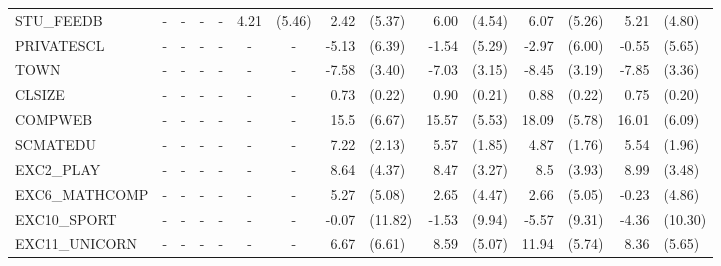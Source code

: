 \documentclass[10pt]{article}
\begin{document}
\begin{table}[htbp]
\begin{tabular}{lrlrlrlrlrlrlrl}
    STU\_FEEDB & \multicolumn{1}{c}{-} & \multicolumn{1}{c}{-} & \multicolumn{1}{c}{-} & \multicolumn{1}{c}{-} & 4.21  & (5.46) & 2.42  & (5.37) & 6.00  & (4.54) & 6.07  & (5.26) & 5.21  & (4.80) \\[0.2em]
    PRIVATESCL & \multicolumn{1}{c}{-} & \multicolumn{1}{c}{-} & \multicolumn{1}{c}{-} & \multicolumn{1}{c}{-} & \multicolumn{1}{c}{-} & \multicolumn{1}{c}{-} & -5.13 & (6.39) & -1.54 & (5.29) & -2.97 & (6.00) & -0.55 & (5.65) \\[0.2em]
    TOWN  & \multicolumn{1}{c}{-} & \multicolumn{1}{c}{-} & \multicolumn{1}{c}{-} & \multicolumn{1}{c}{-} & \multicolumn{1}{c}{-} & \multicolumn{1}{c}{-} & -7.58 & (3.40) & -7.03 & (3.15) & -8.45 & (3.19) & -7.85 & (3.36) \\[0.2em]
    CLSIZE & \multicolumn{1}{c}{-} & \multicolumn{1}{c}{-} & \multicolumn{1}{c}{-} & \multicolumn{1}{c}{-} & \multicolumn{1}{c}{-} & \multicolumn{1}{c}{-} & 0.73  & (0.22) & 0.90  & (0.21) & 0.88  & (0.22) & 0.75  & (0.20) \\[0.2em]
    COMPWEB & \multicolumn{1}{c}{-} & \multicolumn{1}{c}{-} & \multicolumn{1}{c}{-} & \multicolumn{1}{c}{-} & \multicolumn{1}{c}{-} & \multicolumn{1}{c}{-} & 15.5  & (6.67) & 15.57 & (5.53) & 18.09 & (5.78) & 16.01 & (6.09) \\[0.2em]
    SCMATEDU & \multicolumn{1}{c}{-} & \multicolumn{1}{c}{-} & \multicolumn{1}{c}{-} & \multicolumn{1}{c}{-} & \multicolumn{1}{c}{-} & \multicolumn{1}{c}{-} & 7.22  & (2.13) & 5.57  & (1.85) & 4.87  & (1.76) & 5.54  & (1.96) \\[0.2em]
    EXC2\_PLAY & \multicolumn{1}{c}{-} & \multicolumn{1}{c}{-} & \multicolumn{1}{c}{-} & \multicolumn{1}{c}{-} & \multicolumn{1}{c}{-} & \multicolumn{1}{c}{-} & 8.64  & (4.37) & 8.47  & (3.27) & 8.5   & (3.93) & 8.99  & (3.48) \\[0.2em]
    EXC6\_MATHCOMP & \multicolumn{1}{c}{-} & \multicolumn{1}{c}{-} & \multicolumn{1}{c}{-} & \multicolumn{1}{c}{-} & \multicolumn{1}{c}{-} & \multicolumn{1}{c}{-} & 5.27  & (5.08) & 2.65  & (4.47) & 2.66  & (5.05) & -0.23 & (4.86) \\[0.2em]
    EXC10\_SPORT & \multicolumn{1}{c}{-} & \multicolumn{1}{c}{-} & \multicolumn{1}{c}{-} & \multicolumn{1}{c}{-} & \multicolumn{1}{c}{-} & \multicolumn{1}{c}{-} & -0.07 & (11.82) & -1.53 & (9.94) & -5.57 & (9.31) & -4.36 & (10.30) \\[0.2em]
    EXC11\_UNICORN & \multicolumn{1}{c}{-} & \multicolumn{1}{c}{-} & \multicolumn{1}{c}{-} & \multicolumn{1}{c}{-} & \multicolumn{1}{c}{-} & \multicolumn{1}{c}{-} & 6.67  & (6.61) & 8.59  & (5.07) & 11.94 & (5.74) & 8.36  & (5.65) \\[0.2em]

\end{tabular}
\end{table}
\end{document}
